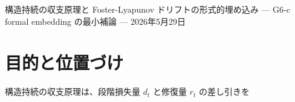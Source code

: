\documentclass[12pt,a4paper]{article}
\begin{document}
\PaperTitleBlock
  {構造持続の収支原理と Foster-Lyapunov ドリフトの形式的埋め込み}
  {— G6-c formal embedding の最小補論 —}
  {2026年5月29日}

\begin{abstract}
本補論は、構造持続の収支原理が既存理論と単に「似ている」のではなく、少なくとも一つの古典的 drift calculus を構造持続の収支原理の変数へ形式的に埋め込めることを示す。

対象にするのは、離散時間過程に対する Foster-Lyapunov drift 条件である。確率過程 \(X_{t}\) と非負関数 \(W\) に対して、負荷

\[
Z_{t} := W(X_{t})
\]

を置き、一段の差分を

\[
b_{t} := Z_{t+1}-Z_{t}
\]

と定義すると、累積純損失量は

\[
B_{n} = \sum_{t=0}^{n-1} b_{t} = Z_{n}-Z_0
\]

となる。また、相対的維持量を

\[
R_{t} := e^{-Z_{t}}
\]

と置けば、

\[
R_{t+1}=R_{t} e^{-b_{t}}
\]

が成り立つ。これは、構造持続の収支原理の局所更新と同じ algebraic shape を持つ。

本補論の主張は限定的である。Foster-Lyapunov theorem の正再帰性定理や幾何的エルゴード性を再証明するものではない。Markov 性、irreducibility、小集合条件、moment 条件など、元理論の仮定はそのまま保持される。本補論が示すのは、Foster-Lyapunov drift calculus の負荷差分が、構造持続の収支原理の純損失量 \(b_{t}\) として読める、という最小の G6-c formal embedding である。

この最小埋め込みは Lean 側でも \texttt{Survival/LyapunovBalanceEmbedding.lean} として形式化されている。Lean が証明しているのは、望遠鏡和、指数的維持量の局所恒等式、正負部分による \(b_{t}=d_{t}-r_{t}\) 分解、および \texttt{QueueStability.lean} の excess demand を純損失量として読む wrapper である。positive recurrence や \(R_{n} \le R_0 e^{-cn}\) 型の指数減衰境界は、次の iteration の対象であり、本補論の範囲外である。
\end{abstract}

\section{目的と位置づけ}\label{ux76eeux7684ux3068ux4f4dux7f6eux3065ux3051}

構造持続の収支原理は、段階損失量 \(d_{t}\) と修復量 \(r_{t}\) の差し引きを
\end{document}
